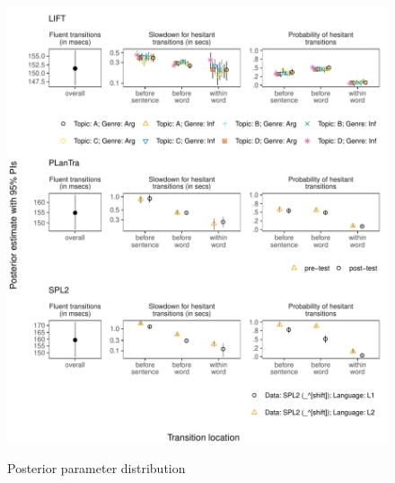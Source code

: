 \documentclass[
  english,
  man,floatsintext]{apa7}
\begin{document}
\begin{appendix}
\begin{figure}[!htb]
\includegraphics{figures/psplots2constr.pdf}
\label{fig:fullps1}
\caption{Posterior parameter distribution}
\end{figure}
\end{appendix}

\clearpage
\makeatletter
\efloat@restorefloats
\makeatother
\end{document}
